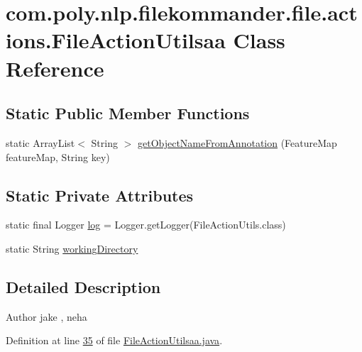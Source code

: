 \hypertarget{classcom_1_1poly_1_1nlp_1_1filekommander_1_1file_1_1actions_1_1_file_action_utilsaa}{\section{com.\-poly.\-nlp.\-filekommander.\-file.\-actions.\-File\-Action\-Utilsaa Class Reference}
\label{classcom_1_1poly_1_1nlp_1_1filekommander_1_1file_1_1actions_1_1_file_action_utilsaa}
}
\subsection*{Static Public Member Functions}
\begin{DoxyCompactItemize}
\item 
static Array\-List$<$ String $>$ \hyperlink{classcom_1_1poly_1_1nlp_1_1filekommander_1_1file_1_1actions_1_1_file_action_utilsaa_abe1c422d6b1901a7889fc6d8b6502c88}{get\-Object\-Name\-From\-Annotation} (Feature\-Map feature\-Map, String key)
\end{DoxyCompactItemize}
\subsection*{Static Private Attributes}
\begin{DoxyCompactItemize}
\item 
static final Logger \hyperlink{classcom_1_1poly_1_1nlp_1_1filekommander_1_1file_1_1actions_1_1_file_action_utilsaa_a77b8f795458e1c7e9b013d6d06c6e97a}{log} = Logger.\-get\-Logger(File\-Action\-Utils.\-class)
\item 
static String \hyperlink{classcom_1_1poly_1_1nlp_1_1filekommander_1_1file_1_1actions_1_1_file_action_utilsaa_af9adb01342997356115f0a50f1ec2087}{working\-Directory}
\end{DoxyCompactItemize}


\subsection{Detailed Description}
\begin{DoxyAuthor}{Author}
jake , neha 
\end{DoxyAuthor}


Definition at line \hyperlink{L35}{35} of file \hyperlink{}{File\-Action\-Utilsaa.\-java}.



